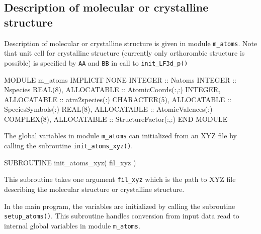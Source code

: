 \subsection{Description of molecular or crystalline structure}

Description of molecular or crystalline structure is given in module {\tt m\_atoms}.
Note that unit cell for crystalline structure (currently only orthorombic structure is
possible) is specified by {\tt AA} and {\tt BB} in call to {\tt init\_LF3d\_p()}

\begin{fortrancode}
MODULE m_atoms
  IMPLICIT NONE 
  INTEGER :: Natoms
  INTEGER :: Nspecies
  REAL(8), ALLOCATABLE :: AtomicCoords(:,:)
  INTEGER, ALLOCATABLE :: atm2species(:)
  CHARACTER(5), ALLOCATABLE :: SpeciesSymbols(:)
  REAL(8), ALLOCATABLE :: AtomicValences(:)
  COMPLEX(8), ALLOCATABLE :: StructureFactor(:,:)
END MODULE 
\end{fortrancode}

The global variables in module {\tt m\_atoms} can initialized from
an XYZ file by calling the
subroutine {\tt init\_atoms\_xyz()}.
\begin{fortrancode}
SUBROUTINE init_atoms_xyz( fil_xyz )
\end{fortrancode}
This subroutine takes one argument {\tt fil\_xyz} which is the path
to XYZ file describing the molecular structure or crystalline structure.

In the main program, the variables are initialized by calling the
subroutine {\tt setup\_atoms()}. This subroutine handles conversion from
input data read to internal global variables in
module {\tt m\_atoms}.


